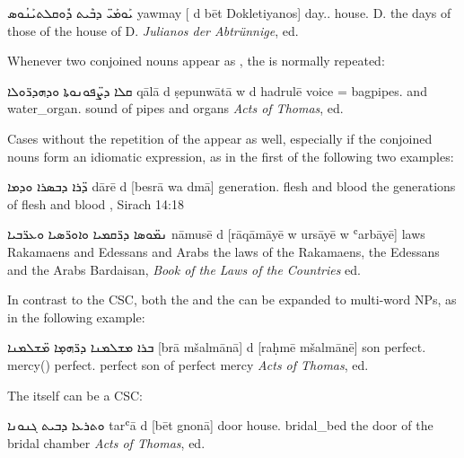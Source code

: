 {{ 
{ܝܰܘܡܰܝ̈ ܕܒܶܝܬ ܕܽܘܩܠܬܝܰܢܳܘܣ}
 {yawmay [\zero{} d\cb{} bēt Dokletiyanos]}
 {day.\pl.\cst{} \hspace{0.7ex}\zero{} \lnk\cb{} house.\cst{} D. }
 {the days of those of the house of D.}
 {\textit{Julianos der Abtrünnige}, ed.\ \cite[24, 9]{Hoffmann} \apud\ \cite[339, \S 357g]{DuvalSyriaque}}

 
 Whenever two conjoined nouns appear as \secns, the \lnk* is normally repeated:
 
 {ܩܠܐ ܕܨ̈ܦܘܢܘܬܐ ܘܕܗܕܪ̈ܘܠܐ}
 {qālā d\cb{} ṣepunwātā w\cb{} d\cb{} hadrulē}
 {voice \lnk= bagpipes.\pl{} and\cb{} \lnk\cb{} water\_organ.\pl}
 {sound of pipes and organs}
 {\textit{Acts of Thomas}, ed.\ \cite[]{WrightActs}}
 
 Cases without the repetition of the \lnk* appear as well, especially  if the conjoined nouns form an idiomatic expression, as in the first of the following two examples:
 
 {ܕ̈ܪܐ ܕܒܣܪܐ ܘܕܡܐ}
 {dārē d\cb{} [besrā wa\cb{} dmā]}
 {generation.\pl{} \lnk\cb{} flesh and\cb{} blood}
 {the generations of flesh and blood}
 {\Pesh, Sirach 14:18 \apud\linebreak \cite[209]{PeursenBenSira}}

 
{ܢܡ̈ܘܣܐ ܕܪ̈ܩܡܝܐ ܘܐܘܪ̈ܣܝܐ ܘܥܪ̈ܒܝܐ}
{nāmusē d\cb{} [rāqāmāyē w\cb{} ursāyē w\cb{} ʿarbāyē]}
{laws \lnk\cb{} Rakamaens and\cb{} Edessans and\cb{} Arabs}
{the laws of the Rakamaens, the Edessans and the Arabs}
{Bardaisan, \textit{Book of the Laws of the Countries} ed. \cite[46:13]{Drijvers} \apud \cite[125]{BakkerBardaisan}}
 
 In contrast to the CSC, both the \prim and the \secn can be expanded to multi-word NPs, as in the following example:
 






{ܒܪܐ ܡܫܠܡܢܐ ܕܪ̈ܗܡ̣ܐ ܡ̈ܫܠܡܢܐ}
{[brā mšalmānā] d\cb{} [raḥmē mšalmānē]}
{son perfect.\masc{} \lnk\cb{} mercy(\pl) perfect.\mpl}
{perfect son of perfect mercy}
{\textit{Acts of Thomas}, ed.\ \cite[]{WrightActs}}


The \secn itself can be a CSC:

{ܘܬܪܥܐ ܕܒܝܬ ܓܢܘܢܐ}
{tarʿā d\cb{} [bēt gnonā]}
{door \lnk\cb{} house.\cst{} bridal\_bed }
{the door of the bridal chamber}
{\textit{Acts of Thomas}, ed.\ \cite[]{WrightActs}}
 
}}
